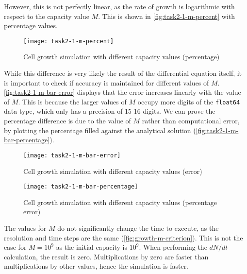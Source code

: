 However, this is not perfectly linear, as the rate of growth is logarithmic with respect to the capacity value $M$.
This is shown in \autoref{fig:task2-1-m-percent} with percentage values.

\begin{figure}[ht]
    \centering
    \texttt{[image: task2-1-m-percent]}
    \caption[Cell growth simulation with different capacity values (percentage)]{Cell growth simulation with different capacity values (percentage)}
    \label{fig:task2-1-m-percent}
\end{figure}

\clearpage





While this difference is very likely the result of the differential equation itself, it is important to check if accuracy is maintained for different values of $M$.
\autoref{fig:task2-1-m-bar-error} displays that the error increases linearly with the value of $M$.
This is because the larger values of $M$ occupy more digits of the \verb|float64| data type, which only has a precision of 15-16 digits.
We can prove the percentage difference is due to the value of $M$ rather than computational error,
by plotting the percentage filled against the analytical solution (\autoref{fig:task2-1-m-bar-percentage}).

\begin{figure}[ht]
    \centering
    \texttt{[image: task2-1-m-bar-error]}
    \caption[Cell growth simulation with different capacity values (error)]{Cell growth simulation with different capacity values (error) }
    \label{fig:task2-1-m-bar-error}
\end{figure}

\begin{figure}[ht]
    \centering
    \texttt{[image: task2-1-m-bar-percentage]}
    \caption[Cell growth simulation with different capacity values (percentage error)]{Cell growth simulation with different capacity values (percentage error) }
    \label{fig:task2-1-m-bar-percentage}
\end{figure}

The values for $M$ do not significantly change the time to execute, as the resolution and time steps are the same (\autoref{fig:growth-m-criterion}).
This is not the case for $M=10^9$ as the initial capacity is $10^9$.
When performing the $dN/dt$ calculation, the result is zero.
Multiplications by zero are faster than multiplications by other values, hence the simulation is faster.

